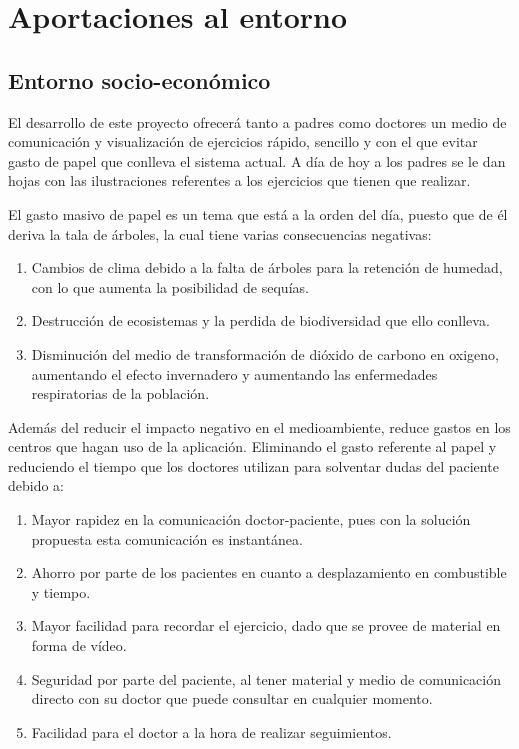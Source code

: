 \section{Aportaciones al entorno}
\subsection{Entorno socio-económico}
El desarrollo de este proyecto ofrecerá tanto a padres como doctores un medio de comunicación
y visualización de ejercicios rápido, sencillo y con el que evitar gasto de papel que conlleva
el sistema actual. A día de hoy a los padres se le dan hojas con las ilustraciones referentes
a los ejercicios que tienen que realizar.

\medskip
El gasto masivo de papel es un tema que está a la orden del día, puesto que de él deriva la
tala de árboles, la cual tiene varias consecuencias negativas:
\begin{enumerate}
    \item Cambios de clima debido a la falta de árboles para la retención de humedad, con lo que aumenta la posibilidad de sequías.
    \item Destrucción de ecosistemas y la perdida de biodiversidad que ello conlleva.
    \item Disminución del medio de transformación de dióxido de carbono en oxigeno, aumentando el efecto invernadero y aumentando las enfermedades respiratorias de la población.
\end{enumerate}

\bigskip
Además del reducir el impacto negativo en el medioambiente, reduce gastos en los centros
que hagan uso de la aplicación. Eliminando el gasto referente al papel y reduciendo el
tiempo que los doctores utilizan para solventar dudas del paciente debido a:
\begin{enumerate}
    \item Mayor rapidez en la comunicación doctor-paciente, pues con la solución propuesta esta comunicación es instantánea.
    \item Ahorro por parte de los pacientes en cuanto a desplazamiento en combustible y tiempo.
    \item Mayor facilidad para recordar el ejercicio, dado que se provee de material en forma de vídeo.
    \item Seguridad por parte del paciente, al tener material y medio de comunicación directo con su doctor que puede consultar en cualquier momento.
    \item Facilidad para el doctor a la hora de realizar seguimientos.
\end{enumerate}

